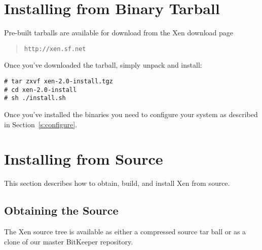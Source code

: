 \section{Installing from Binary Tarball}

Pre-built tarballs are available for download from the Xen download
page
\begin{quote} {\tt http://xen.sf.net}
\end{quote}

Once you've downloaded the tarball, simply unpack and install:
\begin{verbatim}
# tar zxvf xen-2.0-install.tgz
# cd xen-2.0-install
# sh ./install.sh
\end{verbatim}

Once you've installed the binaries you need to configure your system
as described in Section~\ref{s:configure}.


\section{Installing from Source}

This section describes how to obtain, build, and install Xen from
source.

\subsection{Obtaining the Source}

The Xen source tree is available as either a compressed source tar
ball or as a clone of our master BitKeeper repository.

